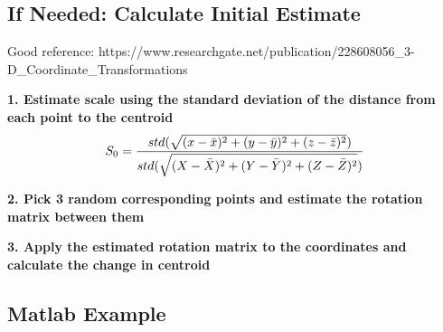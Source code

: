 \subsection{If Needed: Calculate Initial Estimate}
Good reference: https://www.researchgate.net/publication/228608056\_3-D\_Coordinate\_Transformations
\vspace{0.5cm}

\noindent
\textbf{1. Estimate scale using the standard deviation of the distance from each point to the centroid}
\[
S_0 = \dfrac{std(\sqrt{(x-\bar{x})^2+(y-\bar{y})^2+(z-\bar{z})^2})}{std(\sqrt{(X-\bar{X})^2+(Y-\bar{Y})^2+(Z-\bar{Z})^2})} \\
\]
\vspace{0.5cm}

\noindent
\textbf{2. Pick 3 random corresponding points and estimate the rotation matrix between them}

\vspace{0.5cm}

\noindent
\textbf{3. Apply the estimated rotation matrix to the coordinates and calculate the change in centroid}

\subsection{Matlab Example}

